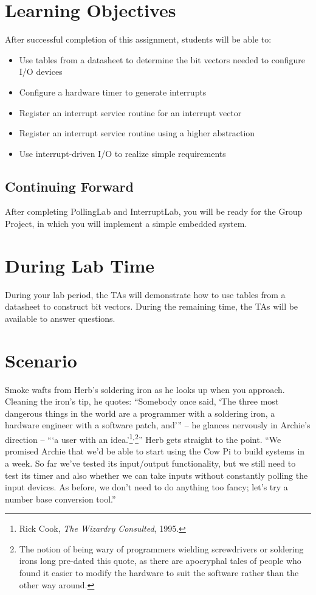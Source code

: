 \section*{Learning Objectives}

After successful completion of this assignment, students will be able to:
\begin{itemize}
\item Use tables from a datasheet to determine the bit vectors needed to
    configure I/O devices
\item Configure a hardware timer to generate interrupts
\item Register an interrupt service routine for an interrupt vector
\item Register an interrupt service routine using a higher abstraction
\item Use interrupt-driven I/O to realize simple requirements
\end{itemize}

\subsection*{Continuing Forward}

After completing PollingLab and InterruptLab, you will be ready for the Group
Project, in which you will implement a simple embedded system.

\section*{During Lab Time}

During your lab period, the TAs will demonstrate how to use tables from a
datasheet to construct bit vectors. During the remaining time, the TAs will be
available to answer questions.

\softwareengineeringfrontmatter

\section{Scenario}

Smoke wafts from Herb's soldering iron as he looks up when you approach.
Cleaning the iron's tip, he quotes: ``Somebody once said, `The three most
dangerous things in the world are a programmer with a soldering iron, a
hardware engineer with a software patch, and'{}'' -- he glances nervously in
Archie's direction -- ``{}`a user with an idea.'\footnote{Rick Cook, \textit{The
Wizardry Consulted}, 1995.}$^{\mathrm{,}}$\footnote{The notion of being wary of
programmers wielding screwdrivers or soldering irons long pre-dated this quote,
as there are apocryphal tales of people who found it easier to modify the
hardware to suit the software rather than the other way around.}'' Herb gets
straight to the point. ``We promised Archie that we'd be able to start using
the Cow Pi to build systems in a week. So far we've tested its input/output
functionality, but we still need to test its timer and also whether we can take
inputs without constantly polling the input devices. As before, we don't need
to do anything too fancy; let's try a number base conversion tool.''

